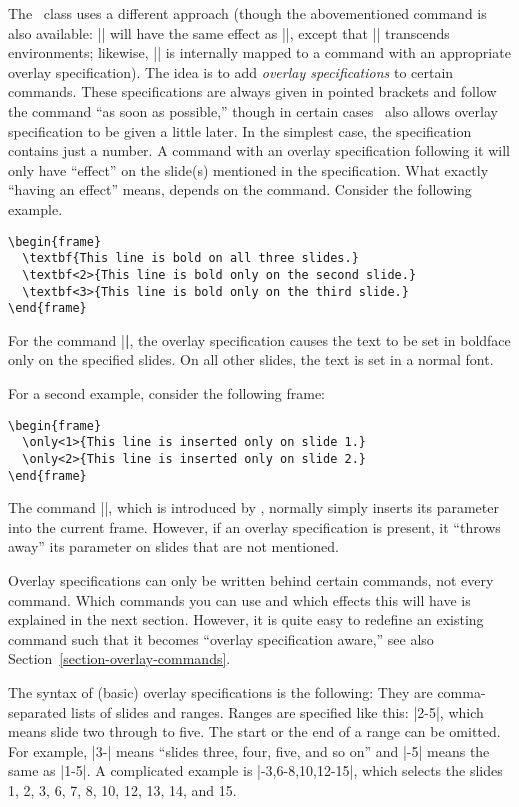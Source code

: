 The \beamer\ class uses a different approach (though the abovementioned command is also available: || will have the same effect as ||, except that |\onslide| transcends environments; likewise, |\pause| is internally mapped to a command with an appropriate overlay specification). The idea is to add \emph{overlay specifications} to certain commands. These specifications are always given in pointed brackets and follow the command ``as soon as possible,'' though in certain cases \beamer\ also allows overlay specification to be given a little later. In the simplest case, the specification contains just a number. A command with an overlay specification following it will only have ``effect'' on the slide(s) mentioned in the specification. What exactly ``having an effect'' means, depends on the command. Consider the following example.
\begin{verbatim}
\begin{frame}
  \textbf{This line is bold on all three slides.}
  \textbf<2>{This line is bold only on the second slide.}
  \textbf<3>{This line is bold only on the third slide.}
\end{frame}
\end{verbatim}

For the command |\textbf|, the overlay specification causes the text to be set in boldface only on the specified slides. On all other slides, the text is set in a normal font.

For a second example, consider the following frame:
\begin{verbatim}
\begin{frame}
  \only<1>{This line is inserted only on slide 1.}
  \only<2>{This line is inserted only on slide 2.}
\end{frame}
\end{verbatim}

The command |\only|, which is introduced by \beamer, normally simply inserts its parameter into the current frame. However, if an overlay specification is present, it ``throws away'' its parameter on slides that are not mentioned.

Overlay specifications can only be written behind certain commands, not every command. Which commands you can use and which effects this will have is explained in the next section. However, it is quite easy to redefine an existing command such that it becomes ``overlay specification aware,'' see also Section~\ref{section-overlay-commands}.

The syntax of (basic) overlay specifications is the following: They are comma-separated lists of slides and ranges. Ranges are specified like this: |2-5|, which means slide two through to five. The start or the end of a range can be omitted. For example, |3-| means ``slides three, four, five, and so on'' and |-5| means the same as |1-5|. A complicated example is |-3,6-8,10,12-15|, which selects the slides 1, 2, 3, 6, 7, 8, 10, 12, 13, 14, and 15.

